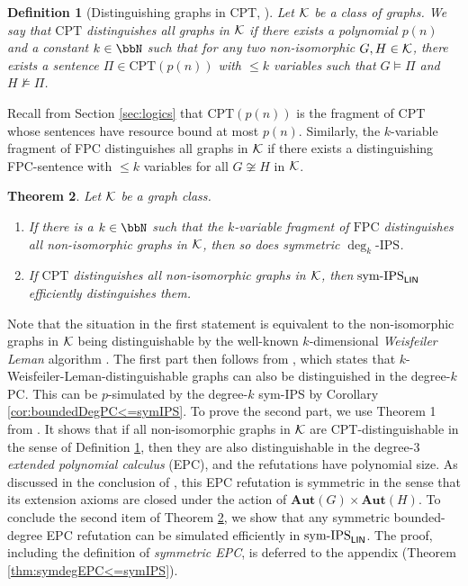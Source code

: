 \documentclass[10pt,a4paper]{article}
\newtheorem{theorem}{Theorem}
\newtheorem{definition}[theorem]{Definition}
\newcommand{\FPC}{\mathrm{FPC}}
\newcommand{\CPT}{\mathrm{CPT}}
\newcommand{\Aut}{\mathbf{Aut}}
\newcommand{\IPS}{\mathrm{IPS}}
\newcommand{\Kk}{{\cal K}}
\newcommand{\symIPSlin}{\text{ \upshape sym-IPS}_{\mathsf{LIN}}}
\begin{document}
\begin{definition}[Distinguishing graphs in CPT, \cite{Pago}]
	\label{def:distinguishingInCPT}
	Let $\Kk$ be a class of graphs. We say that $\CPT$ distinguishes all graphs in $\Kk$ if there exists a polynomial $p(n)$ and a constant $k \in \bbN$ such that for any two non-isomorphic $G, H \in \Kk$, there exists a sentence $\Pi \in \CPT(p(n))$ with $\leq k$ variables such that $G \models \Pi$ and $H \not\models \Pi$. 
\end{definition}	
Recall from Section \ref{sec:logics} that $\CPT(p(n))$ is the fragment of $\CPT$ whose sentences have resource bound at most $p(n)$.
Similarly, the $k$-variable fragment of FPC distinguishes all graphs in $\Kk$ if there exists a distinguishing FPC-sentence with $\leq k$ variables for all $G \not\cong H$ in $\Kk$.
\begin{theorem}
	\label{thm:summaryGI}
	Let $\Kk$ be a graph class. 
	\vspace{-0.2cm}
	\begin{enumerate}
		\item If there is a $k \in \bbN$ such that the $k$-variable fragment of $\FPC$ distinguishes all non-isomorphic graphs in $\Kk$, then so does symmetric $\deg_k\text{-}\IPS$.
		\item If $\CPT$ distinguishes all non-isomorphic graphs in $\Kk$, then$\symIPSlin$ efficiently distinguishes them.
	\end{enumerate}
\end{theorem}	
Note that the situation in the first statement is equivalent to the non-isomorphic graphs in $\Kk$ being distinguishable by the well-known $k$-dimensional \emph{Weisfeiler Leman} algorithm \cite{sandraSiglog}.
The first part then follows from \cite[Theorem 4.4]{GI}, which states that $k$-Weisfeiler-Leman-distinguishable graphs can also be distinguished in the degree-$k$ PC. This can be $p$-simulated by the degree-$k$ sym-IPS by Corollary \ref{cor:boundedDegPC<=symIPS}.
To prove the second part, we use Theorem 1 from \cite{Pago}. It shows that if all non-isomorphic graphs in $\Kk$ are CPT-distinguishable in the sense of Definition \ref{def:distinguishingInCPT}, then they are also distinguishable in the degree-$3$ \emph{extended polynomial calculus} (EPC), and the refutations have polynomial size. As discussed in the conclusion of \cite{Pago}, this EPC refutation is symmetric in the sense that its extension axioms are closed under the action of $\Aut(G) \times \Aut(H)$.
To conclude the second item of Theorem \ref{thm:summaryGI}, we show that any symmetric bounded-degree EPC refutation can be simulated efficiently in$\symIPSlin{}$. The proof, including the definition of \emph{symmetric EPC}, is deferred to the appendix (Theorem \ref{thm:symdegEPC<=symIPS}).
\end{document}
